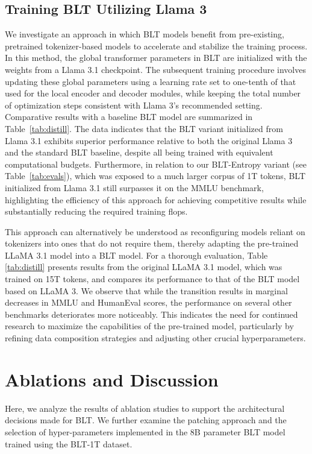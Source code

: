 \subsection{Training {\textsc BLT} Utilizing Llama 3}
\label{sec:distillation}
We investigate an approach in which {\textsc BLT} models benefit from pre-existing, pretrained tokenizer-based models to accelerate and stabilize the training process. In this method, the global transformer parameters in {\textsc BLT} are initialized with the weights from a Llama 3.1 checkpoint. The subsequent training procedure involves updating these global parameters using a learning rate set to one-tenth of that used for the local encoder and decoder modules, while keeping the total number of optimization steps consistent with Llama 3's recommended setting. Comparative results with a baseline {\textsc BLT} model are summarized in Table~\ref{tab:distill}. The data indicates that the {\textsc BLT} variant initialized from Llama 3.1 exhibits superior performance relative to both the original Llama 3 and the standard {\textsc BLT} baseline, despite all being trained with equivalent computational budgets. Furthermore, in relation to our {\textsc BLT}-Entropy variant (see Table~\ref{tab:evals}), which was exposed to a much larger corpus of 1T tokens, {\textsc BLT} initialized from Llama 3.1 still surpasses it on the MMLU benchmark, highlighting the efficiency of this approach for achieving competitive results while substantially reducing the required training flops.

This approach can alternatively be understood as reconfiguring models reliant on tokenizers into ones that do not require them, thereby adapting the pre-trained LLaMA 3.1 model into a {\textsc BLT} model. For a thorough evaluation, Table \ref{tab:distill} presents results from the original LLaMA 3.1 model, which was trained on 15T tokens, and compares its performance to that of the {\textsc BLT} model based on LLaMA 3. We observe that while the transition results in marginal decreases in MMLU and HumanEval scores, the performance on several other benchmarks deteriorates more noticeably. This indicates the need for continued research to maximize the capabilities of the pre-trained model, particularly by refining data composition strategies and adjusting other crucial hyperparameters.

\section{Ablations and Discussion}
\label{section:ablations}
Here, we analyze the results of ablation studies to support the architectural decisions made for {\textsc BLT}. We further examine the patching approach and the selection of hyper-parameters implemented in the 8B parameter {\textsc BLT} model trained using the {\textsc BLT}-1T dataset.

